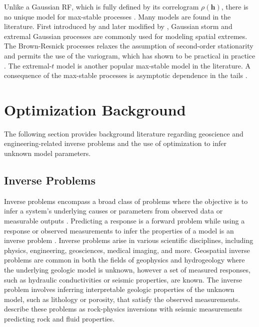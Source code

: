 Unlike a Gaussian \gls{RF}, which is fully defined by its correlogram $\rho(\mathbf{h})$, there is no unique model for max-stable processes \citep{chiles2012geostatistics}. Many models are found in the literature. First introduced by \cite{smith1990maxstable} and later modified by \cite{schlather2002models}, Gaussian storm and extremal Gaussian processes are commonly used for modeling spatial extremes. The Brown-Resnick processes \citep{brown1977extreme,kabluchko2009stationary} relaxes the assumption of second-order stationarity and permits the use of the variogram, which has shown to be practical in practice \citep{gaume2013mapping}. The extremal-$t$ model \citep{opitz2013extremal} is another popular max-stable model in the literature. A consequence of the max-stable processes is asymptotic dependence in the tails \citep{davison2013geostatistics}.


\FloatBarrier
\section{Optimization Background}
\label{sec:01optreview}

The following section provides background literature regarding geoscience and engineering-related inverse problems and the use of optimization to infer unknown model parameters.

\subsection{Inverse Problems}
\label{subsec:01inverse}

Inverse problems encompass a broad class of problems where the objective is to infer a system's underlying causes or parameters from observed data or measurable outputs \citep{sen2013global}. Predicting a response is a forward problem while using a response or observed measurements to infer the properties of a model is an inverse problem \citep{tarantola2005inverse}. Inverse problems arise in various scientific disciplines, including physics, engineering, geosciences, medical imaging, and more. Geospatial inverse problems are common in both the fields of geophysics \citep{linde2015geological,giraud2019integration,grana2022probabilistic} and hydrogeology \citep{zhou2014inverse,ghorbanidehno2020recent} where the underlying geologic model is unknown, however a set of measured responses, such as hydraulic conductivities or seismic properties, are known. The inverse problem involves inferring interpretable geologic properties of the unknown model, such as lithology or porosity, that satisfy the observed measurements. \cite{grana2022probabilistic} describe these problems as rock-physics inversions with seismic measurements predicting rock and fluid properties.

